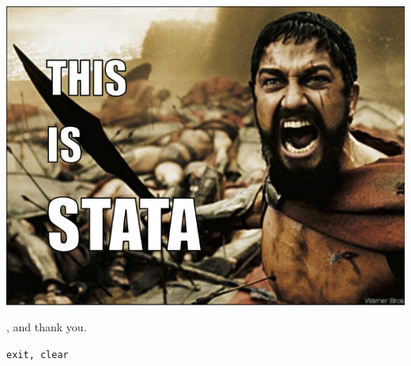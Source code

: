 \documentclass[t]{beamer}
\begin{document}
	\begin{frame}[c,plain]
		\begin{center}
			\includegraphics[width=\textwidth]{this-is-stata.jpg}
		\end{center}
	\end{frame}
	
	\begin{frame}[c,plain]
			\vspace{.3\paperwidth}
		\begin{center}
			{\Large {}, and thank you.}\\
		\end{center}
			\vspace{1em}
			\hspace{.6\paperwidth}
			\texttt{exit, clear}		
	\end{frame}
	
\end{document}
